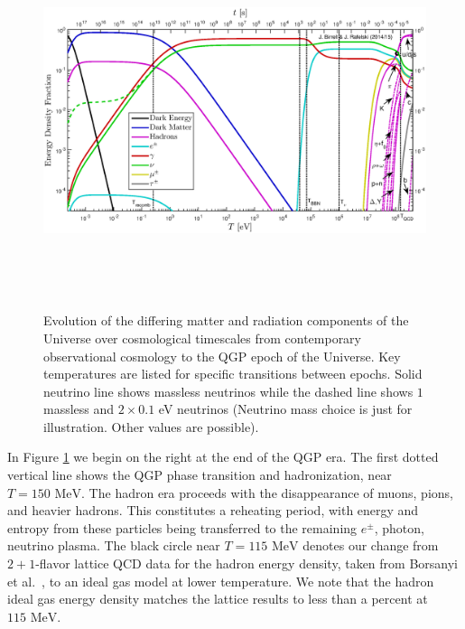 \documentclass[universe,article,submit,moreauthors,pdftex,a4paper]{Definitions/mdpi}
\newcommand{\MeV}{\text{ MeV}}
\begin{document}
\begin{figure}
  \centerline{\hspace*{0.4cm}\includegraphics[height=11cm]{./plots/energy_fractions.eps}}
  \caption{Evolution of the differing matter and radiation components of the Universe over cosmological timescales from contemporary observational cosmology to the QGP epoch of the Universe. Key temperatures are listed for specific transitions between epochs. Solid neutrino line shows massless neutrinos while the dashed line shows $1$ massless and $2\times 0.1$ eV neutrinos (Neutrino mass choice is just for illustration.  Other values are possible). \label{CosmicFraction}}
\end{figure}
In Figure \ref{CosmicFraction} we begin on the right at the end  of the QGP era.  The first dotted vertical line shows the QGP phase transition and hadronization, near $T=150\MeV$. The hadron era proceeds with the disappearance of muons, pions, and heavier hadrons.  This constitutes a reheating period, with energy and entropy from these particles being transferred to the remaining $e^\pm$, photon, neutrino plasma.   The black circle near $T=115\MeV$ denotes our change from $2+1$-flavor lattice QCD data for the hadron energy density, taken from Borsanyi et al.~\cite{Borsanyi:2013bia}, to an ideal gas model at lower temperature.  We note that the hadron ideal gas energy density matches the lattice results to less than a percent at $115\MeV$. 
\end{document}
